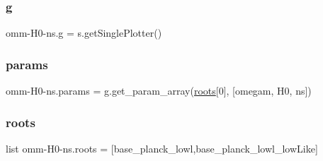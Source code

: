 \subsubsection{\texorpdfstring{g}{g}}
{\footnotesize\ttfamily omm-\/H0-\/ns.\+g = s.\+get\+Single\+Plotter()}

\mbox{\label{namespaceomm-H0-ns_a279cdba8cd2ded2eea0d11344dfa2596}} 
\subsubsection{\texorpdfstring{params}{params}}
{\footnotesize\ttfamily omm-\/H0-\/ns.\+params = g.\+get\+\_\+param\+\_\+array(\mbox{\hyperlink{namespaceomm-H0-ns_ada743c36e65bde6d6e4ca0ae0cf1bbbe}{roots}}\mbox{[}0\mbox{]}, \mbox{[}\textquotesingle{}omegam\textquotesingle{}, \textquotesingle{}H0\textquotesingle{}, \textquotesingle{}ns\textquotesingle{}\mbox{]})}

\mbox{\label{namespaceomm-H0-ns_ada743c36e65bde6d6e4ca0ae0cf1bbbe}} 
\subsubsection{\texorpdfstring{roots}{roots}}
{\footnotesize\ttfamily list omm-\/H0-\/ns.\+roots = \mbox{[}\textquotesingle{}base\+\_\+planck\+\_\+lowl\textquotesingle{},\textquotesingle{}base\+\_\+planck\+\_\+lowl\+\_\+low\+Like\textquotesingle{}\mbox{]}}

